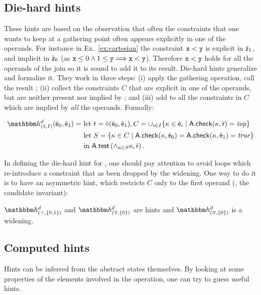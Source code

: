 \documentclass{llncs}
\newcommand{\sopra}{\vspace{-.3cm}}
\begin{document}
\subsection{Die-hard hints}
These hints are based on the observation that often the constraints that one wants to keep at a  gathering point  often appears explicitly in one of the operands.
For instance in Ex.~\ref{ex:cartesian} the constraint $\mathtt{x} < \mathtt{y}$ is explicit in $\bar{\mathsf{\mathsf{z}}}_1$, and implicit in $\bar{\mathsf{\mathsf{z}}}_0$ (as $\mathtt{x} \leq 0 \wedge 1 \leq \mathtt{y} \Longrightarrow \mathtt{x} < \mathtt{y}$).
Therefore $\mathtt{x} < \mathtt{y}$ holds for all the operands of the join so it is sound to add it to its result.
Die-hard hints generalize and formalize it.
They work in three steps: (i) apply the gathering operation, call the result ; (ii) collect the constraints $C$ that are explicit in one of the operands, but are neither present nor implied by ; and (iii) add to  all the constraints in $C$ which are implied by \emph{all} the operands.
Formally:

\sopra
\begin{small}
  \[
  \begin{split}
    \hint{(\ael{\op}, I)}^{d}(\ael{e}_0, \ael{e}_1) = \ &  \mathrm{let}\ \ael{r} = \ael{\op}(\ael{e}_0, \ael{e}_1), C = \cup_{i \in I }\{ \kappa \in \ael{e}_i \mid \adom{A}.\checkif(\kappa, \ael{r}) = \mathit{top} \} \\
    & \mathrm{let}\ S = \{ \kappa \in C \mid \adom{A}.\checkif(\kappa, \ael{e}_0) = \adom{A}.\checkif(\kappa, \ael{e}_1) = \mathit{true} \} \\
& \mathrm{in}\ \adom{A}.\atest\left(\wedge_{\kappa \in S} \kappa, \ael{r}\right).
\end{split}
\]
\end{small}
\sopra

In defining the die-hard hint for \widening, one should pay attention
to avoid loops which re-introduce a constraint that as been dropped by
the widening. 
One way to do it is to have an asymmetric hint, which restricts $C$
only to the first operand (\eg, the candidate invariant):
\begin{lemma}
$\hint{(\cjoin, \{ 0, 1 \})}^{d}$  and $\hint{(\widening, \{ 0 \})
}^{d}$ are hints and  $\hint{(\widening, \{0\})}^{d}$ is a widening.
\end{lemma}


\subsection{Computed hints}
\label{sec:Templatehints}
Hints can be inferred from the abstract states themselves. 
By looking at some properties of the elements involved in the
operation, one can try to guess useful hints. 
\end{document}
